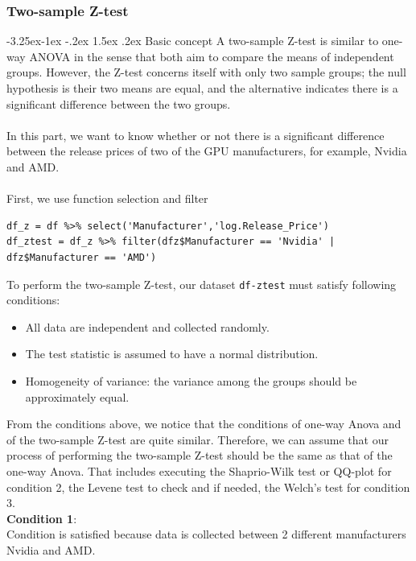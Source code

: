 \documentclass[a4paper]{article}
\makeatletter
\newcounter {subsubsubsection}[subsubsection]
\newcommand\subsubsubsection{\@startsection{subsubsubsection}{4}{\z@}%
                                     {-3.25ex\@plus -1ex \@minus -.2ex}%
                                     {1.5ex \@plus .2ex}%
                                     {\normalfont\normalsize\bfseries}}
\makeatother
\begin{document}
\subsubsection{Two-sample Z-test}
\subsubsubsection{Basic concept}
A two-sample Z-test is similar to one-way ANOVA in the sense that both aim to compare the means of independent groups. However, the Z-test concerns itself with only two sample groups; the null hypothesis is their two means are equal, and the alternative indicates there is a significant difference between the two groups.\\\\
In this part, we want to know whether or not there is a significant difference between the release prices of two of the GPU manufacturers, for example, Nvidia and AMD.\\\\
First, we use function selection and filter 
\begin{mdframed}[leftline=false,rightline=false,backgroundcolor=lightblue!10,nobreak=false]
    \begin{verbatim}
df_z = df %>% select('Manufacturer','log.Release_Price')
df_ztest = df_z %>% filter(dfz$Manufacturer == 'Nvidia' | dfz$Manufacturer == 'AMD')
    \end{verbatim}
\end{mdframed}
To perform the two-sample Z-test, our dataset \verb|df-ztest| must satisfy following conditions:
\begin{itemize}
    \item All data are independent and collected randomly.   
    \item The test statistic is assumed to have a normal distribution.
    \item Homogeneity of variance: the variance among the groups should be approximately equal.
\end{itemize}
From the conditions above, we notice that the conditions of one-way Anova and of the two-sample Z-test are quite similar. Therefore, we can assume that our process of performing the two-sample Z-test should be the same as that of the one-way Anova. That includes executing the Shaprio-Wilk test or QQ-plot for condition 2, the Levene test to check and if needed, the Welch's test for condition 3.\\
\textbf{Condition 1}:\\
Condition is satisfied because data is collected between 2 different manufacturers Nvidia and AMD.\\
\end{document}
